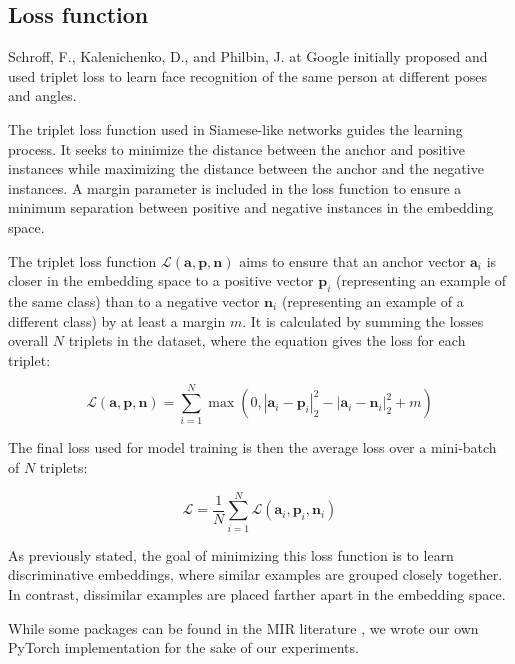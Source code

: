 \subsection{Loss function}

Schroff, F., Kalenichenko, D., and Philbin, J. at Google initially proposed and used triplet loss to learn face recognition of the same person at different poses and angles. \cite{Schroff2015FaceNet:Clustering}

The triplet loss function used in Siamese-like networks guides the learning process. It seeks to minimize the distance between the anchor and positive instances while maximizing the distance between the anchor and the negative instances. A margin parameter is included in the loss function to ensure a minimum separation between positive and negative instances in the embedding space.

The triplet loss function $\mathcal{L}(\mathbf{a}, \mathbf{p}, \mathbf{n})$ aims to ensure that an anchor vector $\mathbf{a}_i$ is closer in the embedding space to a positive vector $\mathbf{p}_i$ (representing an example of the same class) than to a negative vector $\mathbf{n}_i$ (representing an example of a different class) by at least a margin $m$. It is calculated by summing the losses overall $N$ triplets in the dataset, where the equation gives the loss for each triplet:

\begin{equation}
\mathcal{L}(\mathbf{a}, \mathbf{p}, \mathbf{n}) = \sum_{i=1}^{N} \max \left(0, \left| \mathbf{a}_i - \mathbf{p}_i \right|_2^2 - \left| \mathbf{a}_i - \mathbf{n}_i \right|_2^2 + m \right)
\end{equation}

The final loss used for model training is then the average loss over a mini-batch of $N$ triplets:

\begin{equation}
\mathcal{L} = \frac{1}{N} \sum_{i=1}^{N} \mathcal{L}(\mathbf{a}_i, \mathbf{p}_i, \mathbf{n}_i)
\end{equation}

As previously stated, the goal of minimizing this loss function is to learn discriminative embeddings, where similar examples are grouped closely together. In contrast, dissimilar examples are placed farther apart in the embedding space.

While some packages can be found in the MIR literature \cite{auraloss}, we wrote our own PyTorch \cite{Paszke2019PyTorch:Library} implementation for the sake of our experiments.

